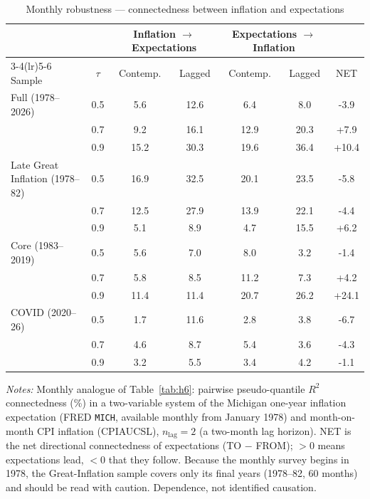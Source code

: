 \begin{table}[!ht]
\centering
\caption{Monthly robustness --- connectedness between inflation and expectations}
\label{tab:h6monthly}
\setlength{\tabcolsep}{6pt}\footnotesize
\begin{threeparttable}
\begin{tabular}{l c c c c c c}
\toprule
 & & \multicolumn{2}{c}{Inflation $\to$ Expectations} & \multicolumn{2}{c}{Expectations $\to$ Inflation} & \\
\cmidrule(lr){3-4}\cmidrule(lr){5-6}
Sample & $\tau$ & Contemp. & Lagged & Contemp. & Lagged & NET \\
\midrule
Full (1978--2026) & 0.5 & 5.6 & 12.6 & 6.4 & 8.0 & -3.9 \\
 & 0.7 & 9.2 & 16.1 & 12.9 & 20.3 & +7.9 \\
 & 0.9 & 15.2 & 30.3 & 19.6 & 36.4 & +10.4 \\
\addlinespace
Late Great Inflation (1978--82) & 0.5 & 16.9 & 32.5 & 20.1 & 23.5 & -5.8 \\
 & 0.7 & 12.5 & 27.9 & 13.9 & 22.1 & -4.4 \\
 & 0.9 & 5.1 & 8.9 & 4.7 & 15.5 & +6.2 \\
\addlinespace
Core (1983--2019) & 0.5 & 5.6 & 7.0 & 8.0 & 3.2 & -1.4 \\
 & 0.7 & 5.8 & 8.5 & 11.2 & 7.3 & +4.2 \\
 & 0.9 & 11.4 & 11.4 & 20.7 & 26.2 & +24.1 \\
\addlinespace
COVID (2020--26) & 0.5 & 1.7 & 11.6 & 2.8 & 3.8 & -6.7 \\
 & 0.7 & 4.6 & 8.7 & 5.4 & 3.6 & -4.3 \\
 & 0.9 & 3.2 & 5.5 & 3.4 & 4.2 & -1.1 \\
\bottomrule
\end{tabular}
\begin{tablenotes}[flushleft]\footnotesize
\item \textit{Notes:} Monthly analogue of Table~\ref{tab:h6}: pairwise pseudo-quantile $R^2$ connectedness (\%) in a two-variable system of the Michigan one-year inflation expectation (FRED \texttt{MICH}, available monthly from January 1978) and month-on-month CPI inflation (CPIAUCSL), $n_{\text{lag}}=2$ (a two-month lag horizon). NET is the net directional connectedness of expectations (TO $-$ FROM); $>0$ means expectations lead, $<0$ that they follow. Because the monthly survey begins in 1978, the Great-Inflation sample covers only its final years (1978--82, 60 months) and should be read with caution. Dependence, not identified causation.
\end{tablenotes}
\end{threeparttable}
\end{table}

